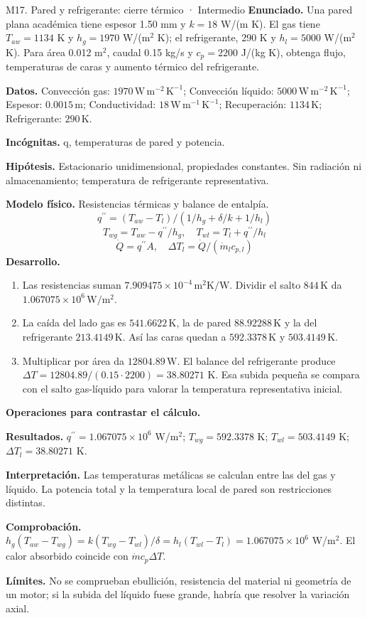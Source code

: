 \begin{studiumworked}{M17. Pared y refrigerante: cierre térmico · Intermedio}
\textbf{Enunciado.} Una pared plana académica tiene espesor 1.50 mm y $k=18$ W/(m K). El gas tiene $T_{aw}=1134$ K y $h_g=1970$ W/(m$^2$ K); el refrigerante, 290 K y $h_l=5000$ W/(m$^2$ K). Para área 0.012 m$^2$, caudal 0.15 kg/s y $c_p=2200$ J/(kg K), obtenga flujo, temperaturas de caras y aumento térmico del refrigerante.

\textbf{Datos.} Convección gas: $1970\,\mathrm{W\,m^{-2}\,K^{-1}}$; Convección líquido: $5000\,\mathrm{W\,m^{-2}\,K^{-1}}$; Espesor: $0.0015\,\mathrm{m}$; Conductividad: $18\,\mathrm{W\,m^{-1}\,K^{-1}}$; Recuperación: $1134\,\mathrm{K}$; Refrigerante: $290\,\mathrm{K}$.

\textbf{Incógnitas.} q, temperaturas de pared y potencia.

\textbf{Hipótesis.} Estacionario unidimensional, propiedades constantes. Sin radiación ni almacenamiento; temperatura de refrigerante representativa.

\textbf{Modelo físico.} Resistencias térmicas y balance de entalpía.
\[q^{\prime\prime}=(T_{aw}-T_l)/(1/h_g+\delta/k+1/h_l)\]
\[T_{wg}=T_{aw}-q^{\prime\prime}/h_g,\quad T_{wl}=T_l+q^{\prime\prime}/h_l\]
\[\dot Q=q^{\prime\prime}A,\quad \Delta T_l=\dot Q/(\dot m_lc_{p,l})\]
\textbf{Desarrollo.}
\begin{enumerate}
\item Las resistencias suman $7.909475\times10^{-4}\,\mathrm{m^2K/W}$. Dividir el salto $844\,\mathrm{K}$ da $1.067075\times10^{6}\,\mathrm{W/m^2}$.
\item La caída del lado gas es $541.6622\,\mathrm{K}$, la de pared $88.92288\,\mathrm{K}$ y la del refrigerante $213.4149\,\mathrm{K}$. Así las caras quedan a $592.3378\,\mathrm{K}$ y $503.4149\,\mathrm{K}$.
\item Multiplicar por área da $12804.89\,\mathrm{W}$. El balance del refrigerante produce $\Delta T=12804.89/(0.15\cdot2200)=38.80271$ K. Esa subida pequeña se compara con el salto gas-líquido para valorar la temperatura representativa inicial.
\end{enumerate}
\textbf{Operaciones para contrastar el cálculo.}

\textbf{Resultados.} $q^{\prime\prime}=1.067075\times10^{6}$ W/m$^2$; $T_{wg}=592.3378$ K; $T_{wl}=503.4149$ K; $\Delta T_l=38.80271$ K.

\textbf{Interpretación.} Las temperaturas metálicas se calculan entre las del gas y líquido. La potencia total y la temperatura local de pared son restricciones distintas.

\textbf{Comprobación.} $h_g(T_{aw}-T_{wg})=k(T_{wg}-T_{wl})/\delta=h_l(T_{wl}-T_l)=1.067075\times10^{6}$ W/m$^2$. El calor absorbido coincide con $\dot m c_p\Delta T$.

\textbf{Límites.} No se comprueban ebullición, resistencia del material ni geometría de un motor; si la subida del líquido fuese grande, habría que resolver la variación axial.
\end{studiumworked}
